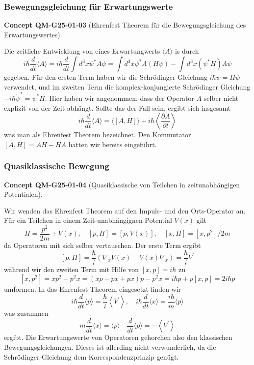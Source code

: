\documentclass[10pt, letterpaper]{article}
\newcommand{\CustomHeading}[3]{%
  \par\medskip\noindent%
  \textbf{#1 #2} \textnormal{(#3)}.\enskip%
}
\newenvironment{CONC}[2]{\begin{unitbox}\CustomHeading{Concept}{#1}{#2}}{\end{unitbox}}
\begin{document}
\subsubsection*{Bewegungsgleichung für Erwartungswerte}


\begin{CONC}{QM-G25-01-03}{Ehrenfest Theorem für die Bewegungsgleichung des Erwartungswertes}
Die zeitliche Entwicklung von eines Erwartungwerts $\langle A\rangle$ is durch
$$
i \hbar \frac{d}{d t}\langle A\rangle=i \hbar \frac{d}{d t} \int d^{3} x \psi^{*} A \psi=\int d^{3} x \psi^{*} A(H \psi)-\int d^{3} x\left(\psi^{*} H\right) A \psi
$$
gegeben. Für den ersten Term haben wir die Schrödinger Gleichung $i \hbar \dot{\psi}=H \psi$ verwendet, und im zweiten Term die komplex-konjungierte Schrödinger Gleichung $-i \hbar \dot{\psi}^{*}=\psi^{*} H$. Hier haben wir angenommen, dass der Operator $A$ selber nicht explizit von der Zeit abhängt. Sollte das der Fall sein, ergibt sich insgesamt
$$
i \hbar \frac{d}{d t}\langle A\rangle=\langle[A, H]\rangle+i \hbar\left\langle\frac{\partial A}{\partial t}\right\rangle
$$
was man als Ehrenfest Theorem bezeichnet. Den Kommutator $[A, H]=A H-H A$ hatten wir bereits eingeführt.
\end{CONC}



\subsubsection*{Quasiklassische Bewegung}



\begin{CONC}{QM-G25-01-04}{Quasiklassische von Teilchen in zeitunabhängigen Potentialen}
Wir wenden das Ehrenfest Theorem auf den Impuls- und den Orts-Operator an. Für ein Teilchen in einem Zeit-unabhängignen Potential $V(x)$ gilt
$$
H=\frac{p^{2}}{2 m}+V(x), \quad[p, H]=[p, V(x)], \quad[x, H]=\left[x, p^{2}\right] / 2 m
$$
da Operatoren mit sich selber vertauschen. Der erste Term ergibt
$$
[p, H]=\frac{\hbar}{i}\left(\nabla_{x} V(x)-V(x) \nabla_{x}\right)=\frac{\hbar}{i} V^{\prime}
$$
während wir den zweiten Term mit Hilfe von $[x, p]=i \hbar$ zu
$$
\left[x, p^{2}\right]=x p^{2}-p^{2} x=(x p-p x+p x) p-p^{2} x=i \hbar p+p[x, p]=2 i \hbar p
$$
umformen. In das Ehrenfest Theorem eingesetzt finden wir
$$
i \hbar \frac{d}{d t}\langle p\rangle=\frac{\hbar}{i}\left\langle V^{\prime}\right\rangle, \quad i \hbar \frac{d}{d t}\langle x\rangle=\frac{i \hbar}{m}\langle p\rangle
$$
was zusammen
$$
m \frac{d}{d t}\langle x\rangle=\langle p\rangle \quad \frac{d}{d t}\langle p\rangle=-\left\langle V^{\prime}\right\rangle
$$
ergibt. Die Erwartungswerte von Operatoren gehorchen also den klassischen Bewegungsgleichungen. Dieses ist allerding nicht verwunderlich, da die Schrödinger-Gleichung dem Korrespondenzprinzip genügt.
\end{CONC}
\end{document}
